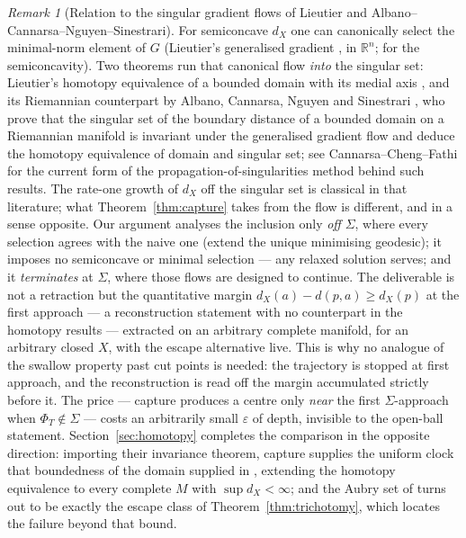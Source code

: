 \documentclass[11pt]{article}
\theoremstyle{remark}
\newtheorem{remark}[theorem]{Remark}
\newcommand{\R}{\mathbb{R}}
\newcommand{\X}{X}
\newcommand{\dX}{d_{\X}}
\begin{document}
\begin{remark}[Relation to the singular gradient flows of Lieutier
and Albano--Cannarsa--Nguyen--Sinestrari]\label{rem:lieutier}
For semiconcave $\dX$ one can canonically select the minimal-norm
element of $G$ (Lieutier's generalised gradient \cite{Lie}, in
$\R^{n}$; \cite{ACa,MM} for the semiconcavity). Two theorems run that
canonical flow \emph{into} the singular set: Lieutier's homotopy
equivalence of a bounded domain with its medial axis \cite{Lie}, and
its Riemannian counterpart by Albano, Cannarsa, Nguyen and Sinestrari
\cite{ACNS}, who prove that the singular set of the boundary distance
of a bounded domain on a Riemannian manifold is invariant under the
generalised gradient flow and deduce the homotopy equivalence of
domain and singular set; see Cannarsa--Cheng--Fathi \cite{CCF} for
the current form of the propagation-of-singularities method behind
such results. The rate-one growth of $\dX$ off the singular set is
classical in that literature; what Theorem~\ref{thm:capture} takes
from the flow is different, and in a sense opposite. Our argument
analyses the inclusion only \emph{off} $\Sigma$, where every
selection agrees with the naive one (extend the unique minimising
geodesic); it imposes no semiconcave or minimal selection --- any
relaxed solution serves; and it \emph{terminates} at $\Sigma$, where
those flows are designed to continue. The deliverable is not a
retraction but the quantitative margin $\dX(a)-d(p,a)\ge\dX(p)$ at
the first approach --- a reconstruction statement with no counterpart
in the homotopy results --- extracted on an arbitrary complete
manifold, for an arbitrary closed $\X$, with the escape alternative
live. This is why no analogue of the swallow property past cut points
is needed: the trajectory is stopped at first approach, and the
reconstruction is read off the margin accumulated strictly before it.
The price --- capture produces a centre only \emph{near} the first
$\Sigma$-approach when $\Phi_{T}\notin\Sigma$ --- costs an
arbitrarily small $\varepsilon$ of depth, invisible to the open-ball
statement. Section~\ref{sec:homotopy} completes the comparison in
the opposite direction: importing their invariance theorem, capture
supplies the uniform clock that boundedness of the domain supplied
in \cite{Lie,ACNS}, extending the homotopy equivalence to every
complete $M$ with $\sup\dX<\infty$; and the Aubry set of \cite{CCF}
turns out to be exactly the escape class of
Theorem~\ref{thm:trichotomy}, which locates the failure beyond that
bound.
\end{remark}
\end{document}
